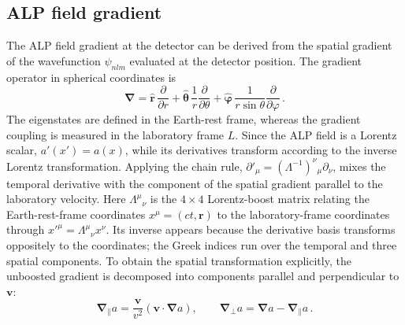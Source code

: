 
\subsection{ALP field gradient}\label{sec:theory:earthALP:gradient}

The ALP field gradient at the detector can be derived from the spatial gradient of the wavefunction $\psi_{nlm}$ evaluated at the detector position.
The gradient operator in spherical coordinates is
\begin{equation}
    \boldsymbol{\nabla} = \hat{\mathbf{r}}\,\frac{\partial}{\partial r} + \hat{\boldsymbol{\theta}}\,\frac{1}{r}\frac{\partial}{\partial \theta} + \hat{\boldsymbol{\varphi}}\,\frac{1}{r\sin\theta}\frac{\partial}{\partial \varphi}
    \,.\label{eq:gradient_spherical}
\end{equation}
The eigenstates are defined in the Earth-rest frame, whereas the gradient coupling is measured in the laboratory frame $L$.
Since the ALP field is a Lorentz scalar, $a'(x')=a(x)$, while its derivatives transform according to the inverse Lorentz transformation.
Applying the chain rule, $\partial'_\mu=(\Lambda^{-1})^\nu{}_\mu\partial_\nu$, mixes the temporal derivative with the component of the spatial gradient parallel to the laboratory velocity.
Here $\Lambda^\mu{}_\nu$ is the $4\times4$ Lorentz-boost matrix relating the Earth-rest-frame coordinates $x^\mu=(ct,\mathbf{r})$ to the laboratory-frame coordinates through $x'^\mu=\Lambda^\mu{}_\nu x^\nu$.
Its inverse appears because the derivative basis transforms oppositely to the coordinates; the Greek indices run over the temporal and three spatial components.
To obtain the spatial transformation explicitly, the unboosted gradient is decomposed into components parallel and perpendicular to $\mathbf{v}$:
\begin{equation}
    \boldsymbol{\nabla}_{\parallel}a
    =
    \frac{\mathbf{v}}{v^2}
    \left(\mathbf{v}\cdot\boldsymbol{\nabla}a\right),
    \qquad
    \boldsymbol{\nabla}_{\perp}a
    =
    \boldsymbol{\nabla}a-\boldsymbol{\nabla}_{\parallel}a
    \,.
\end{equation}
